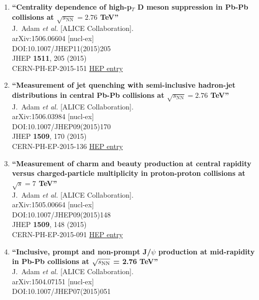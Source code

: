 \begin{enumerate}
\item%
{\bf ``Centrality dependence of high-p$_{T}$ D meson suppression in Pb-Pb collisions at $ \sqrt{s_{\mathrm{N}\mathrm{N}}}=2.76 $ TeV''}
  \\{}J.~Adam {\it et al.} [ALICE Collaboration].
  \\{}arXiv:1506.06604 [nucl-ex]
  \\{}DOI:10.1007/JHEP11(2015)205
  \\{}JHEP {\bf 1511}, 205 (2015)
  \\{}CERN-PH-EP-2015-151
\href{http://inspirehep.net/record/1377363}{HEP entry}
\item%
{\bf ``Measurement of jet quenching with semi-inclusive hadron-jet distributions in central Pb-Pb collisions at $ \sqrt{s_{\mathrm{NN}}}=2.76 $ TeV''}
  \\{}J.~Adam {\it et al.} [ALICE Collaboration].
  \\{}arXiv:1506.03984 [nucl-ex]
  \\{}DOI:10.1007/JHEP09(2015)170
  \\{}JHEP {\bf 1509}, 170 (2015)
  \\{}CERN-PH-EP-2015-136
\href{http://inspirehep.net/record/1376027}{HEP entry}
\item%
{\bf ``Measurement of charm and beauty production at central rapidity versus charged-particle multiplicity in proton-proton collisions at $ \sqrt{s}=7 $ TeV''}
  \\{}J.~Adam {\it et al.} [ALICE Collaboration].
  \\{}arXiv:1505.00664 [nucl-ex]
  \\{}DOI:10.1007/JHEP09(2015)148
  \\{}JHEP {\bf 1509}, 148 (2015)
  \\{}CERN-PH-EP-2015-091
\href{http://inspirehep.net/record/1366028}{HEP entry}
\item%
{\bf ``Inclusive, prompt and non-prompt J/$\psi$ production at mid-rapidity in Pb-Pb collisions at $\sqrt{s_{\rm NN}}$ = 2.76 TeV''}
  \\{}J.~Adam {\it et al.} [ALICE Collaboration].
  \\{}arXiv:1504.07151 [nucl-ex]
  \\{}DOI:10.1007/JHEP07(2015)051

\end{enumerate}
